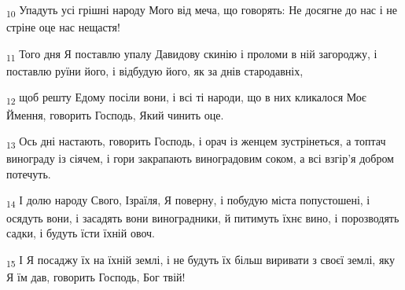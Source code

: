 \begin{tcolorbox}
\textsubscript{10} Упадуть усі грішні народу Мого від меча, що говорять: Не досягне до нас і не стріне оце нас нещастя!
\end{tcolorbox}
\begin{tcolorbox}
\textsubscript{11} Того дня Я поставлю упалу Давидову скинію і проломи в ній загороджу, і поставлю руїни його, і відбудую його, як за днів стародавніх,
\end{tcolorbox}
\begin{tcolorbox}
\textsubscript{12} щоб решту Едому посіли вони, і всі ті народи, що в них кликалося Моє Ймення, говорить Господь, Який чинить оце.
\end{tcolorbox}
\begin{tcolorbox}
\textsubscript{13} Ось дні настають, говорить Господь, і орач із женцем зустрінеться, а топтач винограду із сіячем, і гори закрапають виноградовим соком, а всі взгір'я добром потечуть.
\end{tcolorbox}
\begin{tcolorbox}
\textsubscript{14} І долю народу Свого, Ізраїля, Я поверну, і побудую міста попустошені, і осядуть вони, і засадять вони виноградники, й питимуть їхнє вино, і порозводять садки, і будуть їсти їхній овоч.
\end{tcolorbox}
\begin{tcolorbox}
\textsubscript{15} І Я посаджу їх на їхній землі, і не будуть їх більш виривати з своєї землі, яку Я їм дав, говорить Господь, Бог твій!
\end{tcolorbox}
